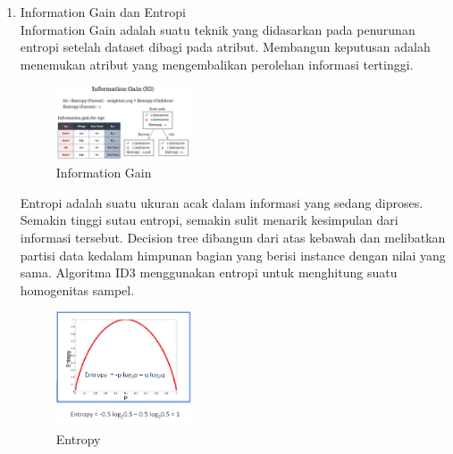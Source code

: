 \begin{enumerate}
\item Information Gain dan Entropi\\
Information Gain adalah suatu teknik yang didasarkan pada penurunan entropi setelah dataset dibagi pada atribut. Membangun keputusan adalah menemukan atribut yang mengembalikan perolehan informasi tertinggi.
\begin{figure}[H]
		\includegraphics[width=4cm]{figures/1174073/2/information.png}
		\centering
		\caption{Information Gain}
\end{figure}

Entropi adalah suatu ukuran acak dalam informasi yang sedang diproses. Semakin tinggi sutau entropi, semakin sulit menarik kesimpulan dari informasi tersebut. Decision tree dibangun dari atas kebawah dan melibatkan partisi data kedalam himpunan bagian yang berisi instance dengan nilai yang sama. Algoritma ID3 menggunakan entropi untuk menghitung suatu homogenitas sampel. 
\begin{figure}[H]
		\includegraphics[width=4cm]{figures/1174073/2/entropy.png}
		\centering
		\caption{Entropy}
\end{figure}
\end{enumerate}

